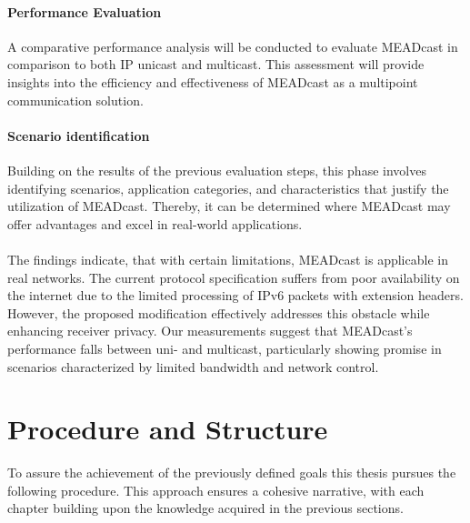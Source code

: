 \paragraph{Performance Evaluation} %
\label{par:Performance Evaluation}
A comparative performance analysis will be conducted to evaluate MEADcast in
    comparison to both IP unicast and multicast.
This assessment will provide insights into the efficiency and effectiveness of
    MEADcast as a multipoint communication solution.

\paragraph{Scenario identification} %
\label{par:Scenario identification}
Building on the results of the previous evaluation steps, this phase involves
    identifying scenarios, application categories, and characteristics that
    justify the utilization of MEADcast.
Thereby, it can be determined where MEADcast may offer advantages and excel in
    real-world applications.
    
    
\paragraph{} %
The findings indicate, that with certain limitations, MEADcast is applicable in
    real networks.
The current protocol specification suffers from poor availability on the
    internet due to the limited processing of IPv6 packets with extension
    headers.
However, the proposed modification effectively addresses this obstacle while
    enhancing receiver privacy.
Our measurements suggest that MEADcast's performance falls between uni- and
    multicast, particularly showing promise in scenarios characterized by
    limited bandwidth and network control.



\section{Procedure and Structure} %
\label{sec:Structure}
To assure the achievement of the previously defined goals this thesis pursues
    the following procedure.
This approach ensures a cohesive narrative, with each chapter building upon the
    knowledge acquired in the previous sections.

